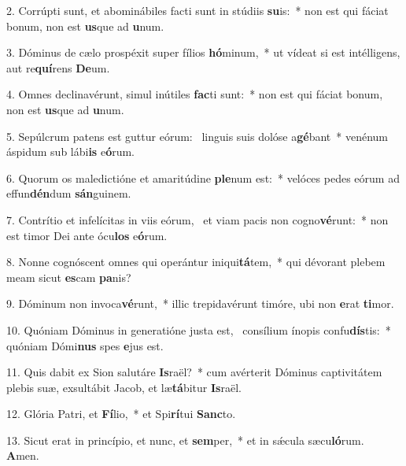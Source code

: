 2. Corrúpti sunt, et abominábiles facti sunt in stúdiis \textbf{su}is:~*  non est qui fáciat bonum, non est \textbf{us}que ad \textbf{u}num.\

3. Dóminus de cælo prospéxit super fílios \textbf{hó}minum,~*  ut vídeat si est intélligens, aut re\textbf{quí}rens \textbf{De}um.\

4. Omnes declinavérunt, simul inútiles \textbf{fac}ti sunt:~*  non est qui fáciat bonum, non est \textbf{us}que ad \textbf{u}num.\

5. Sepúlcrum patens est guttur eórum: \dag\  linguis suis dolóse a\textbf{gé}bant~*  venénum áspidum sub lábi\textbf{is} e\textbf{ó}rum.\

6. Quorum os maledictióne et amaritúdine \textbf{ple}num est:~*  velóces pedes eórum ad effun\textbf{dén}dum \textbf{sán}guinem.\

7. Contrítio et infelícitas in viis eórum, \dag\  et viam pacis non cogno\textbf{vé}runt:~*  non est timor Dei ante ócu\textbf{los} e\textbf{ó}rum.\

8. Nonne cognóscent omnes qui operántur iniqui\textbf{tá}tem,~*  qui dévorant plebem meam sicut \textbf{es}cam \textbf{pa}nis?\

9. Dóminum non invoca\textbf{vé}runt,~*  illic trepidavérunt timóre, ubi non \textbf{e}rat \textbf{ti}mor.\

10. Quóniam Dóminus in generatióne justa est, \dag\  consílium ínopis confu\textbf{dís}tis:~*  quóniam Dómi\textbf{nus} spes \textbf{e}jus est.\

11. Quis dabit ex Sion salutáre \textbf{Is}raël?~*  cum avérterit Dóminus captivitátem plebis suæ, exsultábit Jacob, et læ\textbf{tá}bitur \textbf{Is}raël.\

12. Glória Patri, et \textbf{Fí}lio,~*  et Spi\textbf{rí}tui \textbf{Sanc}to.\

13. Sicut erat in princípio, et nunc, et \textbf{sem}per,~*  et in sǽcula sæcu\textbf{ló}rum. \textbf{A}men.\


